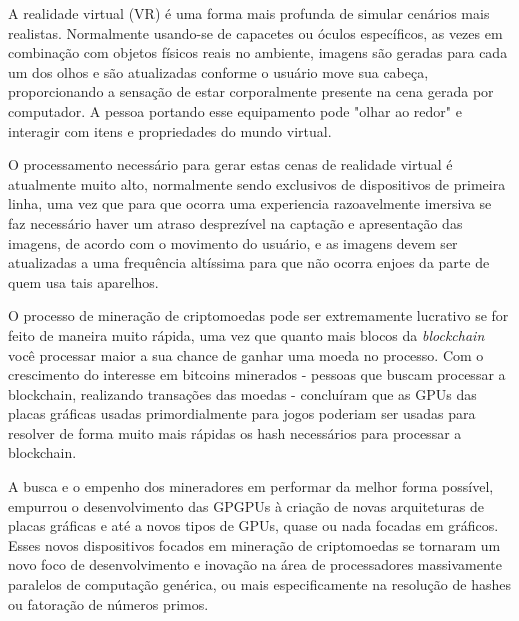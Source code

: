   A realidade virtual (VR) é uma forma mais profunda de simular cenários mais realistas. Normalmente usando-se de capacetes ou óculos específicos, as vezes em combinação com objetos físicos reais no ambiente, imagens são geradas para cada um dos olhos e são atualizadas conforme o usuário move sua cabeça, proporcionando a sensação de estar corporalmente presente na cena gerada por computador. A pessoa portando esse equipamento pode "olhar ao redor" e interagir com itens e propriedades do mundo virtual.

  O processamento necessário para gerar estas cenas de realidade virtual é atualmente muito alto, normalmente sendo exclusivos de dispositivos de primeira linha, uma vez que para que ocorra uma experiencia razoavelmente imersiva se faz necessário haver um atraso desprezível na captação e apresentação das imagens, de acordo com o movimento do usuário, e as imagens devem ser atualizadas a uma frequência altíssima para que não ocorra enjoes da parte de quem usa tais aparelhos.

  O processo de mineração de criptomoedas pode ser extremamente lucrativo se for feito de maneira muito rápida, uma vez que quanto mais blocos da \textit{blockchain} você processar maior a sua chance de ganhar uma moeda no processo. Com o crescimento do interesse em bitcoins minerados - pessoas que buscam processar a blockchain, realizando transações das moedas - concluíram que as GPUs das placas gráficas usadas primordialmente para jogos poderiam ser usadas para resolver de forma muito mais rápidas os hash necessários para processar a blockchain.


  A busca e o empenho dos mineradores em performar da melhor forma possível, empurrou o desenvolvimento das GPGPUs à criação de novas arquiteturas de placas gráficas e até a novos tipos de GPUs, quase ou nada focadas em gráficos. Esses novos dispositivos focados em mineração de criptomoedas se tornaram um novo foco de desenvolvimento e inovação na área de processadores massivamente paralelos de computação genérica, ou mais especificamente na resolução de hashes ou fatoração de números primos.
